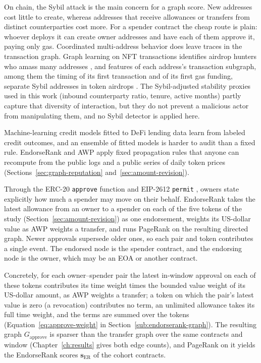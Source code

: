 On chain, the Sybil attack \parencite{douceur2002sybil} is the main concern for a graph score. New addresses cost little to create, whereas addresses that receive allowances or transfers from distinct counterparties cost more. For a spender contract the cheap route is plain: whoever deploys it can create owner addresses and have each of them approve it, paying only gas. Coordinated multi-address behavior does leave traces in the transaction graph. Graph learning on NFT transactions identifies airdrop hunters who amass many addresses \parencite{zhou2024artemis}, and features of each address's transaction subgraph, among them the timing of its first transaction and of its first gas funding, separate Sybil addresses in token airdrops \parencite{liu2025sybil}. The Sybil-adjusted stability proxies used in this work (inbound counterparty ratio, tenure, active months) partly capture that diversity of interaction, but they do not prevent a malicious actor from manipulating them, and no Sybil detector is applied here.

Machine-learning credit models fitted to DeFi lending data \parencite{kotb2023credit} learn from labeled credit outcomes, and an ensemble of fitted models is harder to audit than a fixed rule. EndorseRank and AWP apply fixed propagation rules that anyone can recompute from the public logs and a public series of daily token prices (Sections~\ref{sec:graph-reputation} and~\ref{sec:amount-revision}).


Through the ERC-20 \texttt{approve} function \parencite{vogelsteller2015erc20} and EIP-2612 \texttt{permit} \parencite{lundfall2020permit}, owners state explicitly how much a spender may move on their behalf. EndorseRank takes the latest allowance from an owner to a spender on each of the five tokens of the study (Section~\ref{sec:amount-revision}) as one endorsement, weights its US-dollar value as AWP weights a transfer, and runs PageRank on the resulting directed graph. Newer approvals supersede older ones, so each pair and token contributes a single event. The endorsed node is the spender contract, and the endorsing node is the owner, which may be an EOA or another contract.

Concretely, for each owner--spender pair the latest in-window approval on each of these tokens contributes its time weight times the bounded value weight of its US-dollar amount, as AWP weights a transfer; a token on which the pair's latest value is zero (a revocation) contributes no term, an unlimited allowance takes its full time weight, and the terms are summed over the tokens (Equation~\eqref{eq:approve-weight} in Section~\ref{sub:endorserank-graph}). The resulting graph $G_{\text{approve}}$ is sparser than the transfer graph over the same contracts and window (Chapter~\ref{ch:results} gives both edge counts), and PageRank on it yields the EndorseRank scores $\mathbf{s}_{\mathrm{ER}}$ of the cohort contracts.

